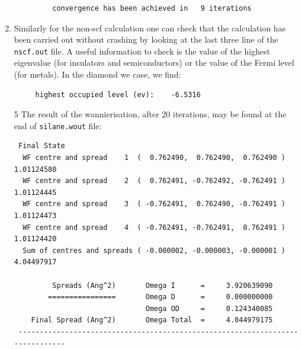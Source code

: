 \begin{enumerate}
\begin{tcolorbox}[sharp corners,boxrule=0.5pt]
{\begin{verbatim}
         convergence has been achieved in   9 iterations
	\end{verbatim}
  }
  \end{tcolorbox}
	\item Similarly for the non-scf calculation one can check that the calculation has been carried out without crashing by looking at the last three line of the {\tt nscf.out} file. A useful information to check is the value of the highest eigenvalue (for insulators and semiconductors) or the value of the Fermi level (for metals). In the diamond we case, we find:
    \begin{tcolorbox}[sharp corners,boxrule=0.5pt]
  {\small
	\begin{verbatim}
     highest occupied level (ev):    -6.5316
	\end{verbatim}
}
\end{tcolorbox}
	\item[5] The result of the wannierisation, after 20 iterations, may be found at the end of {\tt silane.wout} file:
  \begin{tcolorbox}[sharp corners,boxrule=0.5pt]
  {\small
	\begin{verbatim}
 Final State
  WF centre and spread    1  (  0.762490,  0.762490,  0.762490 )     1.01124580
  WF centre and spread    2  (  0.762491, -0.762492, -0.762491 )     1.01124445
  WF centre and spread    3  ( -0.762491,  0.762490, -0.762491 )     1.01124473
  WF centre and spread    4  ( -0.762491, -0.762491,  0.762491 )     1.01124420
  Sum of centres and spreads ( -0.000002, -0.000003, -0.000001 )     4.04497917

         Spreads (Ang^2)       Omega I      =     3.920639090
        ================       Omega D      =     0.000000000
                               Omega OD     =     0.124340085
    Final Spread (Ang^2)       Omega Total  =     4.044979175
 ------------------------------------------------------------------------------
	\end{verbatim}
  }
  \end{tcolorbox}
\end{enumerate}
